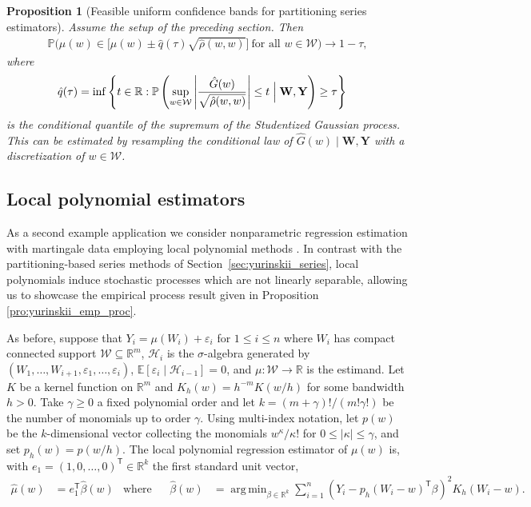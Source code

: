 \documentclass[11pt,lof]{puthesis}
\renewcommand{\P}{\ensuremath{\mathbb{P}}}
\newcommand{\R}{\ensuremath{\mathbb{R}}}
\newcommand{\E}{\ensuremath{\mathbb{E}}}
\newcommand{\bW}{\ensuremath{\mathbf{W}}}
\newcommand{\bY}{\ensuremath{\mathbf{Y}}}
\newcommand{\cH}{\ensuremath{\mathcal{H}}}
\newcommand{\cW}{\ensuremath{\mathcal{W}}}
\newcommand{\T}{\ensuremath{\mathsf{T}}}
\DeclareMathOperator*{\argmin}{arg\,min}
\theoremstyle{break}
\newtheorem{proposition}{Proposition}[section]
\theoremstyle{proof}
\begin{document}
\begin{proposition}[Feasible uniform confidence bands for partitioning
  series estimators]%
  \label{pro:yurinskii_series_feasible}
  Assume the setup of the preceding section. Then
  \begin{align*}
    \P\Big(
      \mu(w) \in
      \Big[
        \hat\mu(w) \pm \hat q(\tau)
        \sqrt{\hat\rho(w,w)}
      \Big]
      \ \text{for all }
    w \in \cW \Big)
    \to 1-\tau,
  \end{align*}
  where
  \begin{align*}
    \hat{q}(\tau)
    &=
    \inf
    \left\{
      t \in \R:
      \P\left(
        \sup_{w \in \cW}
        \left|
        \frac{\hat G(w)}{\sqrt{\hat\rho(w,w)}}
        \right|
        \leq t
        \Bigm| \bW, \bY
      \right)
      \geq \tau
    \right\}
  \end{align*}
  is the conditional quantile of the supremum of the Studentized Gaussian
  process. This can be estimated by resampling the conditional law of
  $\hat G(w) \mid \bW, \bY$ with a discretization of $w \in \cW$.
\end{proposition}

\subsection{Local polynomial estimators}
\label{sec:yurinskii_local_poly}

As a second example application we consider nonparametric regression estimation
with martingale data employing local polynomial methods
\citep{fan1996local}. In contrast with the partitioning-based series
methods of Section~\ref{sec:yurinskii_series}, local polynomials induce
stochastic processes which are not linearly separable, allowing us to showcase
the empirical process result given in Proposition \ref{pro:yurinskii_emp_proc}.

As before, suppose that
$Y_i = \mu(W_i) + \varepsilon_i$
for $ 1 \leq i \leq n$
where $W_i$ has compact connected support $\cW \subseteq \R^m$,
$\cH_i$ is the $\sigma$-algebra generated by
$(W_1, \ldots, W_{i+1}, \varepsilon_1, \ldots, \varepsilon_i)$,
$\E[\varepsilon_i \mid \cH_{i-1}] = 0$,
and $\mu: \cW \to \R$ is the estimand. Let $K$ be a kernel function on $\R^m$
and $K_h(w) = h^{-m} K(w/h)$ for some bandwidth $h > 0$.
Take $\gamma \geq 0$ a fixed polynomial order and let
$k = (m+\gamma)!/(m!\gamma!)$ be the number of monomials up to order $\gamma$.
Using multi-index notation,
let $p(w)$ be the $k$-dimensional vector
collecting the monomials $w^{\kappa}/\kappa!$
for $0 \leq |\kappa| \leq \gamma$,
and set $p_h(w) = p(w/h)$.
The local polynomial regression estimator of $\mu(w)$ is,
with $e_1 = (1, 0, \ldots, 0)^\T \in \R^k$ the first standard unit vector,
%
\begin{align*}
  \hat{\mu}(w)
  &=
  e_1^\T\hat{\beta}(w)
  &\text{where} &
  &\hat{\beta}(w)
  &=
  \argmin_{\beta \in \R^{k}}
  \sum_{i=1}^n
  \left(Y_i - p_h(W_i-w)^\T \beta \right)^2
  K_h(W_i-w).
\end{align*}
\end{document}
